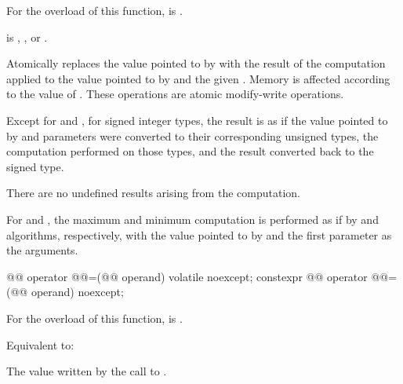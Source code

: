 \begin{itemdescr}
\pnum
\constraints
For the  overload of this function,
 is .

\pnum
\expects
{} is
,
, or
.

\pnum
\effects
Atomically replaces the value pointed to by 
with the result of the computation applied to
the value pointed to by  and the given .
Memory is affected according to the value of .
These operations are atomic modify-write operations.

\pnum
\remarks
Except for  and ,
for signed integer types, the result is as if
the value pointed to by  and parameters
were converted to their corresponding unsigned types,
the computation performed on those types, and
the result converted back to the signed type.
\begin{note}
There are no undefined results arising from the computation.
\end{note}
For  and ,
the maximum and minimum computation is performed
as if by  and  algorithms, respectively,
with the value pointed to by  and the first parameter as the arguments.
\end{itemdescr}

%
%
%
%
%
%
%
\begin{itemdecl}
@@ operator @@=(@@ operand) volatile noexcept;
constexpr @@ operator @@=(@@ operand) noexcept;
\end{itemdecl}

\begin{itemdescr}
\pnum
\constraints
For the  overload of this function,
 is .

\pnum
\effects
Equivalent to: 

\pnum
\returns
The value written by the call to .
\end{itemdescr}

